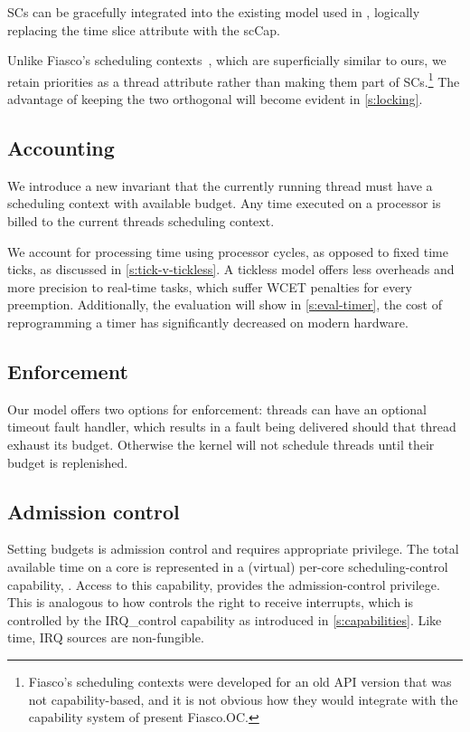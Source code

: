 \glspl{SC} can be gracefully integrated into the 
existing model used in \selfour,
logically replacing the time slice attribute with the scCap. 

Unlike Fiasco's scheduling contexts~\citep{Lackorzynski_WVH_12}, which
are superficially similar to ours, we retain priorities as a thread
attribute rather than making them part of SCs.\footnote{Fiasco's scheduling
contexts were developed for an old API version that was not
capability-based, and it is not obvious how they would integrate
with the capability system of present Fiasco.OC.} The advantage of keeping the two
orthogonal will become evident in \autoref{s:locking}.

\subsection{Accounting}

We introduce a new invariant that the currently running thread must have a scheduling context 
with available budget. Any time executed on a processor is billed to the current threads scheduling
context.

We account for processing time using processor cycles, as opposed to fixed time ticks, as discussed
in \cref{s:tick-v-tickless}. A tickless model offers less overheads and more precision to real-time 
tasks, which suffer \gls{WCET} penalties for every preemption. Additionally, the evaluation will
show in \cref{s:eval-timer}, the cost of reprogramming a timer has significantly decreased on modern hardware. 

\subsection{Enforcement}

Our model offers two options for enforcement: threads can have an optional timeout fault handler,
which results in a fault being delivered should that thread exhaust its budget. Otherwise the kernel
will not schedule threads until their budget is replenished. 

\subsection{Admission control}
\label{sec:model-admission}

Setting budgets is admission control and requires appropriate
privilege. The total available time on a core is represented in a
(virtual) per-core scheduling-control capability, .
Access to this capability, provides the admission-control
privilege. This is analogous to how \selfour controls the right
to receive interrupts, which is controlled by the IRQ\_control
capability as introduced in \cref{s:capabilities}. Like time, IRQ sources are non-fungible.

